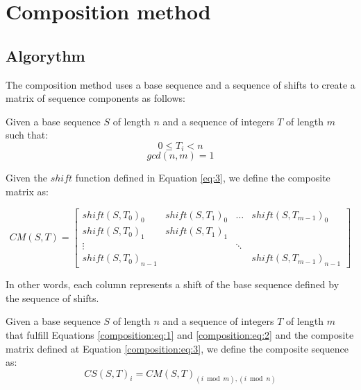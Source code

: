 \section{Composition method}

\subsection{Algorythm}

The composition method uses a base sequence and a sequence of shifts to
create a matrix of sequence components as follows:

\begin{definition}
  Given a base sequence $S$ of length $n$ and a sequence of integers $T$ of
  length $m$ such that:
  \begin{equation}\label{composition:eq:1}
    0 \leq T_{i} < n
  \end{equation}
  \begin{equation}\label{composition:eq:2}
    gcd(n, m) = 1
  \end{equation}

  Given the $shift$ function defined in Equation \ref{eq:3},
  we define the composite matrix as:

  \begin{equation}\label{composition:eq:3}
    CM(S, T) = \begin{bmatrix}
      shift(S, T_{0})_{0} & shift(S, T_{1})_{0} & \dots & shift(S, T_{m-1})_{0} \\
      shift(S, T_{0})_{1} & shift(S, T_{1})_{1} \\
      \vdots & & \ddots \\
      shift(S, T_{0})_{n-1} & & & shift(S, T_{m-1})_{n-1}
    \end{bmatrix}
  \end{equation}

  In other words, each column represents a shift of the base sequence defined
  by the sequence of shifts.
\end{definition}

\begin{definition}
  Given a base sequence $S$ of length $n$ and a sequence of integers $T$ of
  length $m$ that fulfill Equations \ref{composition:eq:1} and
  \ref{composition:eq:2} and the composite matrix defined at Equation
  \ref{composition:eq:3}, we define the composite sequence as:
  \begin{equation}
    CS(S, T)_{i} = CM(S, T)_{(i \bmod m), (i \bmod n)}
  \end{equation}
\end{definition}

